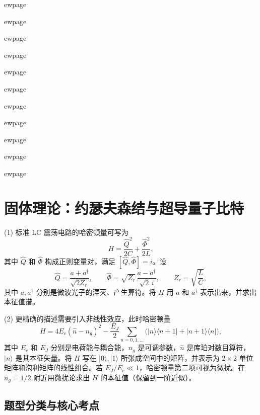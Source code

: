 ewpage

ewpage

ewpage

ewpage

ewpage
\newpage
\newpage
\newpage

ewpage
\newpage
\newpage
\newpage

ewpage
\newpage
\newpage
\newpage

ewpage
\newpage
\newpage
\newpage

ewpage
\newpage
\newpage
\newpage

ewpage
\newpage
\newpage
\newpage
\newpage

ewpage
\newpage
\newpage
\newpage
\newpage
\newpage
\newpage
\newpage
\newpage
\newpage
\newpage
\newpage
\newpage
\newpage
\newpage
\newpage
\newpage
\newpage
\newpage
\newpage
\newpage
\newpage
\newpage
\newpage
\newpage
\newpage
\newpage
\newpage
\newpage
\newpage
\newpage
\newpage
\newpage
\newpage
\newpage
\section{固体理论：约瑟夫森结与超导量子比特}
\label{sec:josephson}

\begin{modelbox}
(1) 标准 LC 震荡电路的哈密顿量可写为
\[
H = \frac{\hat{Q}^2}{2C} + \frac{\hat{\Phi}^2}{2L},
\]
其中 $\hat{Q}$ 和 $\hat{\Phi}$ 构成正则变量对，满足 $[\hat{Q}, \hat{\Phi}] = i$。设
\[
\hat{Q} = \frac{a+a^\dagger}{\sqrt{2Z_r}}, \qquad \hat{\Phi} = \sqrt{Z_r}\, \frac{a-a^\dagger}{\sqrt{2}\,i}, \qquad Z_r = \sqrt{\frac{L}{C}},
\]
其中 $a, a^\dagger$ 分别是微波光子的湮灭、产生算符。将 $H$ 用 $a$ 和 $a^\dagger$ 表示出来，并求出本征值谱。

(2) 更精确的描述需要引入非线性效应，此时哈密顿量
\[
H = 4E_c(\hat{n}-n_g)^2 - \frac{E_J}{2} \sum_{n=0,1,\dots}\bigl(|n\rangle\langle n+1| + |n+1\rangle\langle n|\bigr),
\]
其中 $E_c$ 和 $E_J$ 分别是电荷能与耦合能，$n_g$ 是可调参数，$\hat{n}$ 是库珀对数目算符，$|n\rangle$ 是其本征矢量。将 $H$ 写在 $|0\rangle, |1\rangle$ 所张成空间中的矩阵，并表示为 $2\times 2$ 单位矩阵和泡利矩阵的线性组合。若 $E_J/E_c \ll 1$，哈密顿量第二项可视为微扰。在 $n_g = 1/2$ 附近用微扰论求出 $H$ 的本征值（保留到一阶近似）。
\end{modelbox}

\subsection{题型分类与核心考点}

